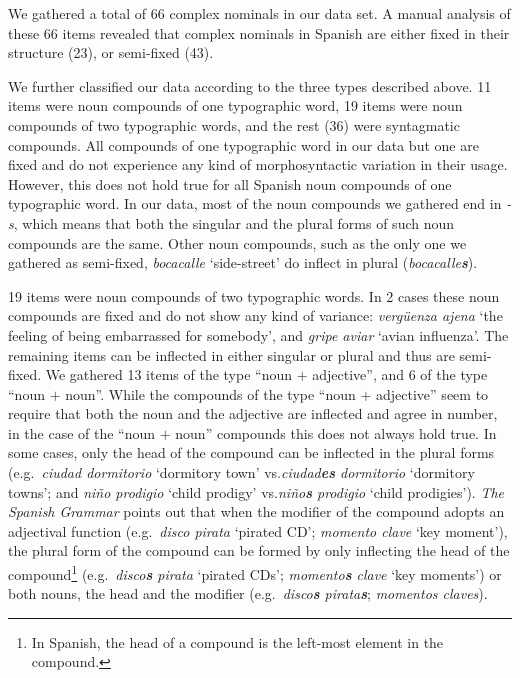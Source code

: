 \documentclass[output=paper]{langsci/langscibook}
\begin{document}
We gathered a total of 66 complex nominals in our data set.
A manual analysis of these 66 items revealed that complex nominals in Spanish are either fixed in their structure (23), or semi-fixed (43).

We further classified our data according to the three types described above.
11 items were noun compounds of one typographic word, 19 items were noun compounds of two typographic words, and the rest (36) were syntagmatic compounds.
All compounds of one typographic word in our data but one are fixed and do not experience any kind of morphosyntactic variation in their usage.
However, this does not hold true for all Spanish noun compounds of one typographic word.
In our data, most of the noun compounds we gathered end in \textit{-s}, which means that both the singular and the plural forms of such noun compounds are the same.
Other noun compounds, such as the only one we gathered as semi-fixed, \textit{bocacalle} `side-street' do inflect in plural (\textit{bocacalle\textbf{s}}).

19 items were noun compounds of two typographic words.
In 2 cases these noun compounds are fixed and do not show any kind of variance: \textit{vergüenza ajena} `the feeling of being embarrassed for somebody', and \textit{gripe aviar} `avian influenza'.
The remaining items can be inflected in either singular or plural and thus are semi-fixed.
We gathered 13 items of the type ``noun $+$ adjective'', and 6 of the type ``noun $+$ noun''.
While the compounds of the type ``noun $+$ adjective'' seem to require that both the noun and the adjective are inflected and agree in number, in the case of the ``noun $+$ noun'' compounds this does not always hold true.
In some cases, only the head of the compound can be inflected in the plural forms (e.g.\  \textit{ciudad dormitorio} `dormitory town' vs.\@ \textit{ciudad\textbf{es} dormitorio} `dormitory towns'; and \textit{niño prodigio} `child prodigy' vs.\@ \textit{niño\textbf{s} prodigio} `child prodigies').
\textit{The Spanish Grammar} \citeyearpar{RAE:2010} points out that when the modifier of the compound adopts an adjectival function (e.g.\ \textit{disco pirata} `pirated CD'; \textit{momento clave} `key moment'), the plural form of the compound can be formed by only inflecting the head of the compound\footnote{In Spanish, the head of a compound is the left-most element in the compound.} (e.g.\ \textit{disco\textbf{s} pirata} `pirated CDs'; \textit{momento\textbf{s} clave} `key moments') or both nouns, the head and the modifier (e.g.\ \textit{disco\textbf{s} pirata\textbf{s}}; \textit{momentos claves}).
\end{document}
